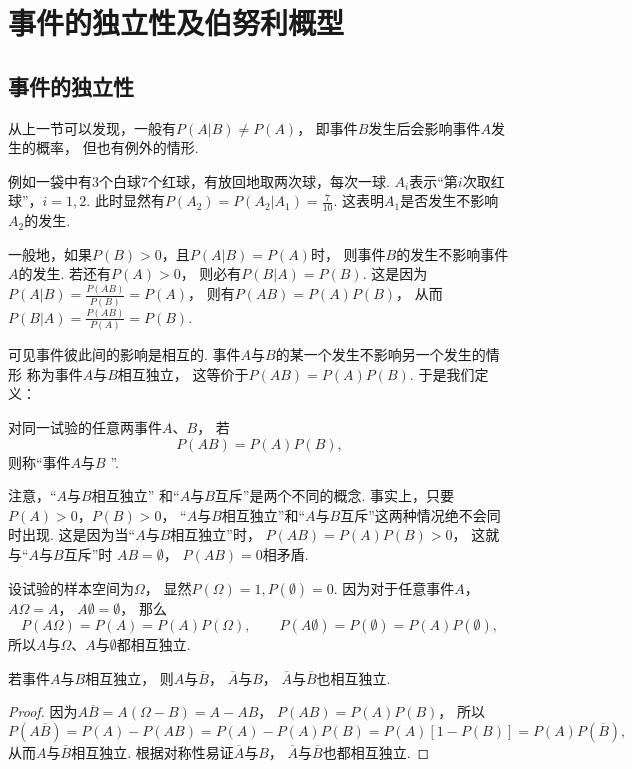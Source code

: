 \section{事件的独立性及伯努利概型}
\subsection{事件的独立性}
从上一节可以发现，一般有\(P(A \vert B) \neq P(A)\)，
即事件\(B\)发生后会影响事件\(A\)发生的概率，
但也有例外的情形.

例如一袋中有3个白球7个红球，有放回地取两次球，每次一球.
\(A_i\)表示“第\(i\)次取红球”，\(i=1,2\).
此时显然有\(P(A_2) = P(A_2 \vert A_1) = \frac{7}{10}\).
这表明\(A_1\)是否发生不影响\(A_2\)的发生.

一般地，如果\(P(B) > 0\)，且\(P(A \vert B) = P(A)\)时，
则事件\(B\)的发生不影响事件\(A\)的发生.
若还有\(P(A) > 0\)，
则必有\(P(B \vert A) = P(B)\).
这是因为\(P(A \vert B) = \frac{P(AB)}{P(B)} = P(A)\)，
则有\(P(AB) = P(A) P(B)\)，
从而\(P(B \vert A) = \frac{P(AB)}{P(A)} = P(B)\).

可见事件彼此间的影响是相互的.
事件\(A\)与\(B\)的某一个发生不影响另一个发生的情形
称为事件\(A\)与\(B\)相互独立，
这等价于\(P(AB) = P(A) P(B)\).
于是我们定义：

\begin{definition}
对同一试验的任意两事件\(A\)、\(B\)，
若\[
	P(AB) = P(A) P(B),
\]
则称“事件\(A\)与\(B\) ”.
\end{definition}

注意，“\(A\)与\(B\)相互独立”
和“\(A\)与\(B\)互斥”是两个不同的概念.
事实上，只要\(P(A) > 0\)，\(P(B) > 0\)，
“\(A\)与\(B\)相互独立”和“\(A\)与\(B\)互斥”这两种情况绝不会同时出现.
这是因为当“\(A\)与\(B\)相互独立”时，
\(P(AB) = P(A) P(B) > 0\)，
这就与“\(A\)与\(B\)互斥”时
\(AB = \emptyset\)，
\(P(AB) = 0\)相矛盾.

设试验的样本空间为\(\Omega\)，
显然\(P(\Omega) = 1,
P(\emptyset) = 0\).
因为对于任意事件\(A\)，
\(A \Omega = A\)，
\(A \emptyset = \emptyset\)，
那么\[
	P(A \Omega) = P(A) = P(A) P(\Omega), \qquad
	P(A \emptyset) = P(\emptyset) = P(A) P(\emptyset),
\]
所以\(A\)与\(\Omega\)、\(A\)与\(\emptyset\)都相互独立.

\begin{theorem}
若事件\(A\)与\(B\)相互独立，
则\(A\)与\(\overline{B}\)，
\(\overline{A}\)与\(B\)，
\(\overline{A}\)与\(\overline{B}\)也相互独立.
\begin{proof}
因为\(A\overline{B}=A(\Omega-B)=A-AB\)，
\(P(AB)=P(A)P(B)\)，
所以\[
	P(A\overline{B})
	= P(A) - P(AB)
	= P(A) - P(A) P(B)
	= P(A) [1 - P(B)]
	= P(A) P(\overline{B}),
\]
从而\(A\)与\(\overline{B}\)相互独立.
根据对称性易证\(\overline{A}\)与\(B\)，
\(\overline{A}\)与\(\overline{B}\)也都相互独立.
\end{proof}
\end{theorem}

